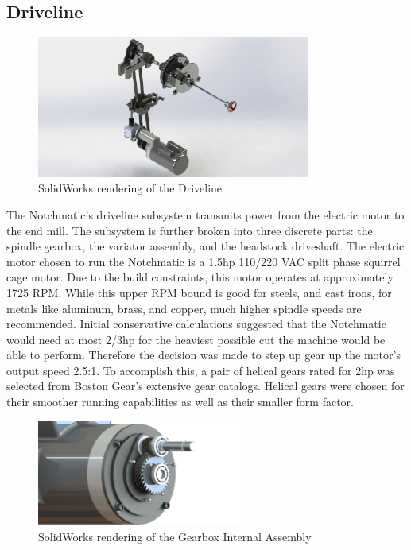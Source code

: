 \newpage

\subsection{Driveline}

\begin{figure}[H]
    \centering
    \includegraphics[width=0.8\textwidth]{./images/Chapter2-MachineDescription/Driveline}
    \caption{SolidWorks rendering of the Driveline}
    \label{fig:Driveline}
\end{figure}


The Notchmatic’s driveline subsystem transmits power from the electric motor to the end mill. The subsystem is further broken into three discrete parts: the spindle gearbox, the variator assembly, and the headstock driveshaft. The electric motor chosen to run the Notchmatic is a 1.5hp 110/220 VAC split phase squirrel cage motor. Due to the build constraints, this motor operates at approximately 1725 RPM. While this upper RPM bound is good for steels, and cast irons, for metals like aluminum, brass, and copper, much higher spindle speeds are recommended.  Initial conservative calculations suggested that the Notchmatic would need at most 2/3hp for the heaviest possible cut the machine would be able to perform. Therefore the decision was made to step up gear up the motor’s output speed 2.5:1.  To accomplish this, a pair of helical gears rated for 2hp was selected from Boston Gear’s extensive gear catalogs. Helical gears were chosen for their smoother running capabilities as well as their smaller form factor. 

\begin{figure}[H]
    \centering
    \includegraphics[width=0.6\textwidth]{./images/Chapter2-MachineDescription/GIA}
    \caption{SolidWorks rendering of the Gearbox Internal Assembly}
    \label{fig:GIA}
\end{figure}

